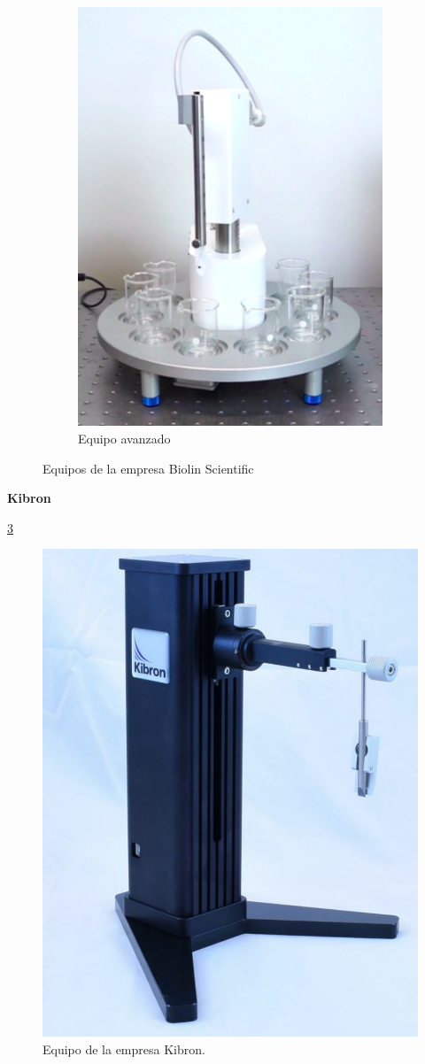 \begin{figure}[!htpb]
\begin{subfigure}[b]{0.4\textwidth}
         \includegraphics[width=.85\textwidth]{./Figures/dip_biolin_2.pdf}
         \caption{Equipo avanzado}
         \label{fig:dip_biolin_2}
     \end{subfigure}
     \hfill
        \caption{Equipos de la empresa Biolin Scientific}
        \label{fig:equipos_biolin}
\end{figure}



\textbf{Kibron}  \citep{2_web_kibron}

\ref{fig:dip_kibron}

\begin{figure}[htbp]
	\centering
	\includegraphics[width=.35\textwidth]{./Figures/kibron.pdf}
	\caption{Equipo de la empresa Kibron.}
	\label{fig:dip_kibron}
\end{figure}

